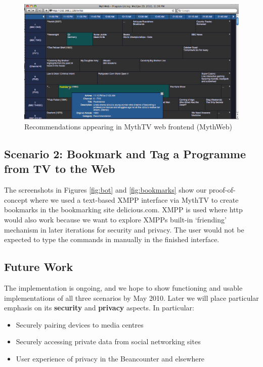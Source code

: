 \documentclass[]{article}%
\begin{document}
\begin{figure}[htbp]
\begin{center}
\includegraphics[width=6in]{mythweb-screen.png}
\caption{Recommendations appearing in MythTV web frontend (MythWeb)} \label{fig:mythweb-recommendations}
\end{center}
\end{figure}


\subsection{Scenario 2: Bookmark and Tag a Programme from TV to the Web}

The screenshots in Figures \ref{fig:bot} and \ref{fig:bookmarks} show our proof-of-concept where we used a text-based XMPP interface via MythTV to create bookmarks in the bookmarking site delicious.com. XMPP is used where http would also work because we want to explore XMPPs built-in `friending' mechanism in later iterations for security and privacy. The user would not be expected to type the commands in manually in the finished interface.

\subsection{Future Work}

The implementation is ongoing, and we hope to show functioning and usable implementations of all three scenarios by May 2010. Later we will place particular emphasis on its {\bf security} and {\bf privacy} aspects. In particular:

\begin{itemize}
\item{Securely pairing devices to media centres}
\item{Securely accessing 	private data from social networking sites}
\item{User experience of privacy in the Beancounter and elsewhere}
\end{itemize}
\end{document}

